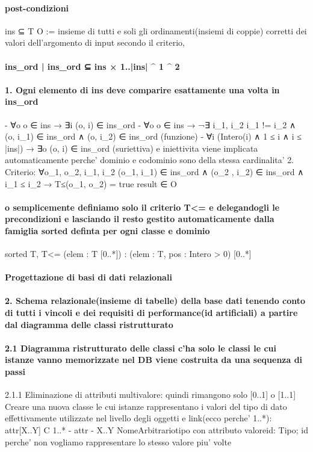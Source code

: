 \documentclass[12pt]{article}
\begin{document}
\paragraph{post-condizioni}
		ins ⊆ T
		O := insieme di tutti e soli gli ordinamenti(insiemi di coppie) corretti dei valori dell'argomento di input secondo il criterio, 
\paragraph{{ins_ord | ins_ord ⊆ ins × 1..|ins| ^ 1 ^ 2}}
\paragraph{1.  Ogni elemento di ins deve comparire esattamente una volta in ins_ord}
					- ∀o o ∈ ins → ∃i (o, i) ∈ ins_ord
					- ∀o o ∈ ins → ¬∃ i_1, i_2 i_1 != i_2 ∧ (o, i_1) ∈ ins_ord ∧ (o, i_2) ∈ ins_ord (funzione)
					- ∀i (Intero(i) ∧ 1 ≤ i ∧ i ≤ |ins|) → ∃o (o, i) ∈ ins_ord (suriettiva) e iniettivita viene implicata automaticamente perche' dominio e codominio sono della stessa 						cardinalita'
				2. Criterio: ∀o_1, o_2, i_1, i_2 (o_1, i_1) ∈ ins_ord ∧ (o_2 , i_2) ∈ ins_ord ∧ i_1 ≤ i_2 → T≤(o_1, o_2) = true
		result ∈ O 

\paragraph{o semplicemente definiamo solo il criterio T<= e delegandogli le precondizioni e lasciando il resto gestito automaticamente dalla famiglia sorted definta per ogni classe e dominio}
	sorted T, T<=  (elem : T [0..*]) : (elem : T, pos : Intero > 0) [0..*]

\paragraph{Progettazione di basi di dati relazionali}
\paragraph{2. Schema relazionale(insieme di tabelle) della base dati tenendo conto di tutti i vincoli e dei requisiti di performance(id artificiali) a partire dal diagramma delle classi ristrutturato}
\paragraph{2.1 Diagramma ristrutturato delle classi c'ha solo le classi le cui istanze vanno memorizzate nel DB viene costruita da una sequenza di passi}
		2.1.1 Eliminazione di attributi multivalore: quindi rimangono solo [0..1] o [1..1]
			Creare una nuova classe le cui istanze rappresentano i valori del tipo di dato effettivamente utilizzate nel livello degli oggetti e link(ecco perche' 1..*): attr[X..Y]
			C 1..* - attr - X..Y NomeArbitrariotipo con attributo valore{id}: Tipo; id perche' non vogliamo rappresentare lo stesso valore piu' volte
\end{document}
